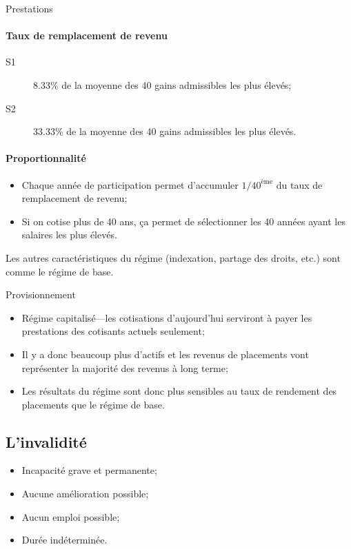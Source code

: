 \documentclass[10pt, french]{article}
\begin{document}
\begin{multicols*}{3}
\begin{conceptgen}{Prestations}
\paragraph*{Taux de remplacement de revenu}
\begin{description}
	\item[S1]	8.33\% de la moyenne des 40 gains admissibles les plus élevés;
	\item[S2]	33.33\% de la moyenne des 40 gains admissibles les plus élevés.
\end{description}


\paragraph*{Proportionnalité}
\begin{itemize}[leftmargin = *]
	\item	Chaque année de participation permet d'accumuler $1/40^{\text{ème}}$ du taux de remplacement de revenu;
	\item	Si on cotise plus de 40 ans, ça permet de sélectionner les 40 années ayant les salaires les plus élevés.
\end{itemize}

Les autres caractéristiques du régime (indexation, partage des droits, etc.) sont comme le régime de base.
\end{conceptgen}

\begin{conceptgen}{Provisionnement}
\begin{itemize}[leftmargin = *]
	\item	Régime capitalisé---les cotisations d'aujourd'hui serviront à payer les prestations des cotisants actuels seulement;
	\item	Il y a donc beaucoup plus d'actifs et les revenus de placements vont représenter la majorité des revenus à long terme;
	\item	Les résultats du régime sont donc plus sensibles au taux de rendement des placements que le régime de base.
\end{itemize}
\end{conceptgen}

\columnbreak

\subsection*{L'invalidité}

\begin{definitionNOHFILL}[Invalide]
\begin{itemize}[leftmargin = *]
	\item	Incapacité grave et permanente;
	\item	Aucune amélioration possible;
	\item	Aucun emploi possible;
	\item	Durée indéterminée.
\end{itemize}


\end{definitionNOHFILL}
\end{multicols*}
\end{document}
